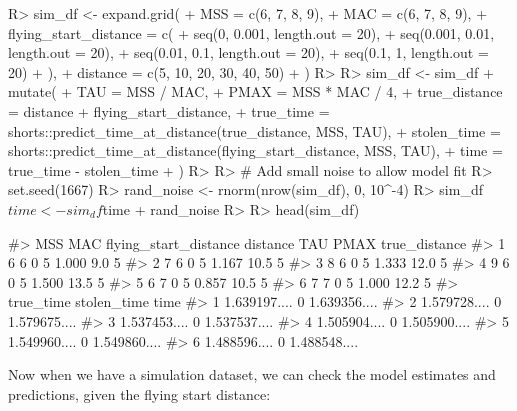 \documentclass[
]{jss}
\begin{document}
\begin{CodeChunk}
\begin{CodeInput}
R> sim_df <- expand.grid(
+   MSS = c(6, 7, 8, 9),
+   MAC = c(6, 7, 8, 9),
+   flying_start_distance = c(
+     seq(0, 0.001, length.out = 20),
+     seq(0.001, 0.01, length.out = 20),
+     seq(0.01, 0.1, length.out = 20),
+     seq(0.1, 1, length.out = 20)
+   ),
+   distance = c(5, 10, 20, 30, 40, 50)
+ )
R> 
R> sim_df <- sim_df %
+   mutate(
+     TAU = MSS / MAC,
+     PMAX = MSS * MAC / 4,
+     true_distance = distance + flying_start_distance,
+     true_time = shorts::predict_time_at_distance(true_distance, MSS, TAU),
+     stolen_time = shorts::predict_time_at_distance(flying_start_distance, MSS, TAU),
+     time = true_time - stolen_time
+   )
R> 
R> # Add small noise to allow model fit
R> set.seed(1667)
R> rand_noise <- rnorm(nrow(sim_df), 0, 10^-4)
R> sim_df$time <- sim_df$time + rand_noise
R> 
R> head(sim_df)
\end{CodeInput}
\begin{CodeOutput}
#>   MSS MAC flying_start_distance distance   TAU PMAX true_distance
#> 1   6   6                     0        5 1.000  9.0             5
#> 2   7   6                     0        5 1.167 10.5             5
#> 3   8   6                     0        5 1.333 12.0             5
#> 4   9   6                     0        5 1.500 13.5             5
#> 5   6   7                     0        5 0.857 10.5             5
#> 6   7   7                     0        5 1.000 12.2             5
#>      true_time stolen_time         time
#> 1 1.639197....           0 1.639356....
#> 2 1.579728....           0 1.579675....
#> 3 1.537453....           0 1.537537....
#> 4 1.505904....           0 1.505900....
#> 5 1.549960....           0 1.549860....
#> 6 1.488596....           0 1.488548....
\end{CodeOutput}
\end{CodeChunk}

Now when we have a simulation dataset, we can check the model estimates and predictions, given the flying start distance:

\begin{CodeChunk}
\end{CodeChunk}
\end{document}
